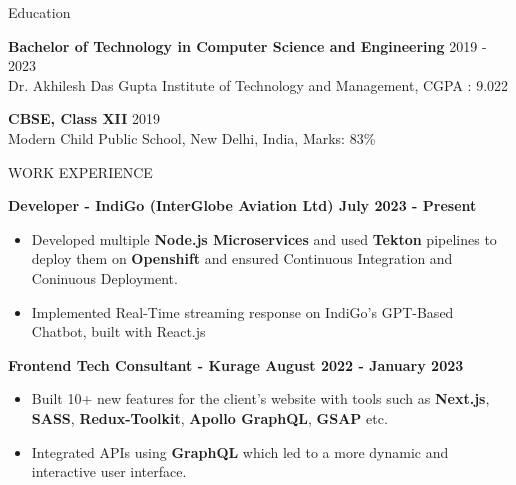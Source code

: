 \documentclass{resume} %
\begin{document}



\begin{rSection}{Education}

{\bf Bachelor of Technology in Computer Science and Engineering} \hfill {2019 - 2023}
\\ 
{\normalfont Dr. Akhilesh Das Gupta Institute of Technology and Management}, {\normalfont CGPA : 9.022} 

{\textbf{CBSE, Class XII}}  \hfill 2019\\
{\normalfont Modern Child Public School, New Delhi, India, {\normalfont Marks: 83\%} } 



\end{rSection}

\begin{rSection}{WORK EXPERIENCE}

{\bf Developer - IndiGo (InterGlobe Aviation Ltd)  \hfill July 2023 - Present }
\begin{itemize}

    \item {\normalfont Developed multiple \textbf{Node.js Microservices} and used \textbf{Tekton} pipelines to deploy them on \textbf{Openshift} and ensured Continuous Integration and Coninuous Deployment. }
   \item {\normalfont Implemented Real-Time streaming response on IndiGo's GPT-Based Chatbot, built with React.js} 
   
 
\end{itemize}


{\bf Frontend Tech Consultant - Kurage  \hfill August 2022 - January 2023 }
\begin{itemize}

    \item {\normalfont  Built 10+ new features for the client's website with tools such as \textbf{{Next.js}}, \textbf{{SASS}}, \textbf{{Redux-Toolkit}}, \textbf{{Apollo GraphQL}}, \textbf{{GSAP}} etc. }
   \item {\normalfont Integrated APIs using \textbf{{GraphQL}} which led to a more dynamic and interactive user interface.} 
 
\end{itemize}
 




\end{rSection}
\end{document}
